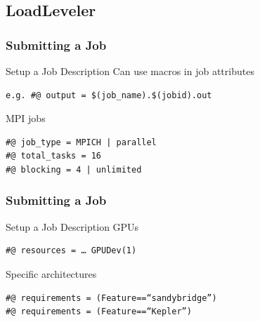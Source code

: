 \documentclass{beamer}
\begin{document}
\subsection{LoadLeveler}




\begin{frame}
  \frametitle{Submitting a Job}
      \begin{block}{Setup a Job Description}
Can use macros in job attributes
\begin{verbatim}
e.g. #@ output = $(job_name).$(jobid).out
\end{verbatim}
MPI jobs
\begin{verbatim}
#@ job_type = MPICH | parallel
#@ total_tasks = 16
#@ blocking = 4 | unlimited
\end{verbatim}
  \end{block}

\end{frame}


\begin{frame}
  \frametitle{Submitting a Job}
      \begin{block}{Setup a Job Description}
GPUs
\begin{verbatim}
#@ resources = … GPUDev(1)
\end{verbatim}

Specific architectures
\begin{verbatim}
#@ requirements = (Feature==“sandybridge”)
#@ requirements = (Feature==“Kepler”)
\end{verbatim}
  \end{block}
\end{frame}
\end{document}
